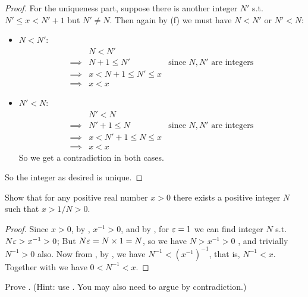 \begin{proof}
For the uniqueness part, suppose there is another integer \(N'\) s.t. \(N' \le x < N' + 1\) but \(N' \ne N\).
Then again by (f) we must have \(N < N'\) or \(N' < N\):
\begin{itemize}
    \item \(N < N'\):
        \begin{align*}
                     & N < N' \\
            \implies & N + 1 \le N' & \text{since \(N, N'\) are integers} \\
            \implies & x < N + 1 \leq N' \le x \\
            \implies & x < x
        \end{align*}
    \item \(N' < N\):
        \begin{align*}
                     & N' < N \\
            \implies & N' + 1 \le N & \text{since \(N, N'\) are integers} \\
            \implies & x < N' + 1 \le N \le x \\
            \implies & x < x
        \end{align*}
So we get a contradiction in both cases.
\end{itemize}
So the integer as desired is unique.
\end{proof}

\begin{exercise} \label{exercise 5.4.4}
Show that for any positive real number \(x > 0\) there exists a positive integer \(N\) such that \(x > 1/N > 0\).
\end{exercise}

\begin{proof}
Since \(x > 0\), by , \(x^{-1} > 0\), and by , for \(\varepsilon = 1\) we can find integer \(N\) s.t. \(N\varepsilon > x^{-1} > 0\);
But \(N\varepsilon = N \times 1 = N\), so we have \(N > x^{-1} > 0\) , and trivially \(N^{-1} > 0\)  also.
Now from , by , we have \(N^{-1} < (x^{-1})^{-1}\), that is, \(N^{-1} < x\).
Together with  we have \(0 < N^{-1} < x\).
\end{proof}

\begin{exercise} \label{exercise 5.4.5}
Prove .
(Hint: use .
You may also need to argue by contradiction.)
\end{exercise}

